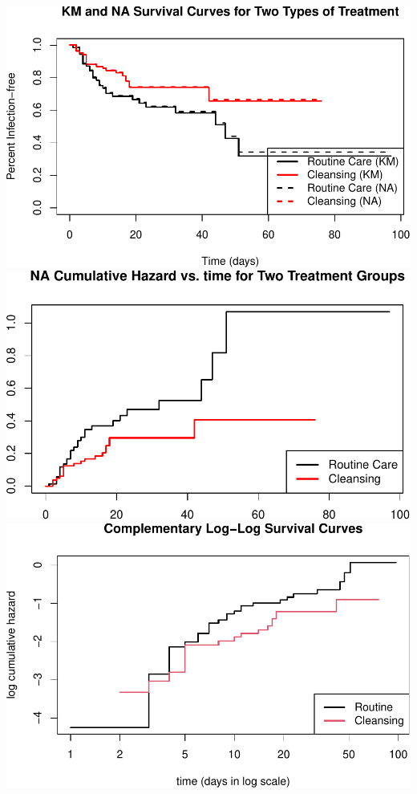 \documentclass[12pt]{article}
\begin{document}
\includegraphics{Survival-Analysis-of-Infection-Control-Measures-in-Burn-Patients_files/figure-latex/unnamed-chunk-6-1.pdf}
\includegraphics{Survival-Analysis-of-Infection-Control-Measures-in-Burn-Patients_files/figure-latex/unnamed-chunk-6-2.pdf}
\includegraphics{Survival-Analysis-of-Infection-Control-Measures-in-Burn-Patients_files/figure-latex/unnamed-chunk-6-3.pdf}
\end{document}
